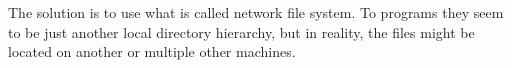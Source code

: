 The solution is to use what is called network file system.
To programs they seem to be just another local directory hierarchy, but in reality, the files might be located on another or multiple other machines.

